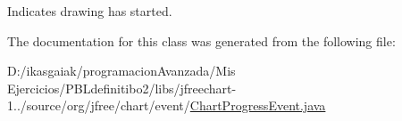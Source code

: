 Indicates drawing has started. 

The documentation for this class was generated from the following file\+:\begin{DoxyCompactItemize}
\item 
D\+:/ikasgaiak/programacion\+Avanzada/\+Mis Ejercicios/\+P\+B\+Ldefinitibo2/libs/jfreechart-\/1../source/org/jfree/chart/event/\mbox{\hyperlink{_chart_progress_event_8java}{Chart\+Progress\+Event.\+java}}\end{DoxyCompactItemize}
